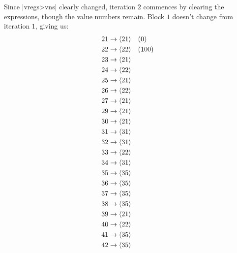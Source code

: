 Since \factor|vregs>vns| clearly changed, iteration $2$ commences by clearing
the expressions, though the value numbers remain.  Block $1$ doesn't change
from iteration $1$, giving us:
%
\begin{align*}
  21 &\to \langle 21\rangle \quad (0)                 \\
  22 &\to \langle 22\rangle \quad (100)               \\
  23 &\to \langle 21\rangle                           \\
  24 &\to \langle 22\rangle                           \\
  25 &\to \langle 21\rangle                           \\
  26 &\to \langle 22\rangle                           \\
  27 &\to \langle 21\rangle                           \\
  29 &\to \langle 21\rangle                           \\
  30 &\to \langle 21\rangle                           \\
  31 &\to \langle 31\rangle                           \\
  32 &\to \langle 31\rangle                           \\
  33 &\to \langle 22\rangle                           \\
  34 &\to \langle 31\rangle                           \\
  35 &\to \langle 35\rangle                           \\
  36 &\to \langle 35\rangle                           \\
  37 &\to \langle 35\rangle                           \\
  38 &\to \langle 35\rangle                           \\
  39 &\to \langle 21\rangle                           \\
  40 &\to \langle 22\rangle                           \\
  41 &\to \langle 35\rangle                           \\
  42 &\to \langle 35\rangle
\end{align*}

